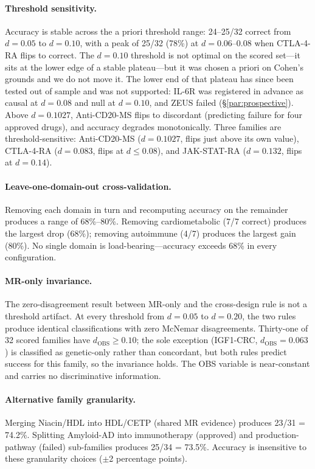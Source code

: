 \documentclass[11pt]{article}
\begin{document}
\paragraph{Threshold sensitivity.} Accuracy is stable across the a priori threshold range: 24--25/32 correct from $d = 0.05$ to $d = 0.10$, with a peak of 25/32 (78\%) at $d = 0.06$--$0.08$ when CTLA-4-RA flips to correct. The $d = 0.10$ threshold is not optimal on the scored set---it sits at the lower edge of a stable plateau---but it was chosen a priori on Cohen's grounds and we do not move it. The lower end of that plateau has since been tested out of sample and was not supported: IL-6R was registered in advance as causal at $d = 0.08$ and null at $d = 0.10$, and ZEUS failed (\S\ref{par:prospective}). Above $d = 0.1027$, Anti-CD20-MS flips to discordant (predicting failure for four approved drugs), and accuracy degrades monotonically. Three families are threshold-sensitive: Anti-CD20-MS ($d = 0.1027$, flips just above its own value), CTLA-4-RA ($d = 0.083$, flips at $d \leq 0.08$), and JAK-STAT-RA ($d = 0.132$, flips at $d = 0.14$).

\paragraph{Leave-one-domain-out cross-validation.} Removing each domain in turn and recomputing accuracy on the remainder produces a range of 68\%--80\%. Removing cardiometabolic (7/7 correct) produces the largest drop (68\%); removing autoimmune (4/7) produces the largest gain (80\%). No single domain is load-bearing---accuracy exceeds 68\% in every configuration.

\paragraph{MR-only invariance.} The zero-disagreement result between MR-only and the cross-design rule is not a threshold artifact. At every threshold from $d = 0.05$ to $d = 0.20$, the two rules produce identical classifications with zero McNemar disagreements. Thirty-one of 32 scored families have $d_{\text{OBS}} \geq 0.10$; the sole exception (IGF1-CRC, $d_{\text{OBS}} = 0.063$) is classified as genetic-only rather than concordant, but both rules predict success for this family, so the invariance holds. The OBS variable is near-constant and carries no discriminative information.

\paragraph{Alternative family granularity.} Merging Niacin/HDL into HDL/CETP (shared MR evidence) produces 23/31 = 74.2\%. Splitting Amyloid-AD into immunotherapy (approved) and production-pathway (failed) sub-families produces 25/34 = 73.5\%. Accuracy is insensitive to these granularity choices ($\pm$2 percentage points).
\end{document}
